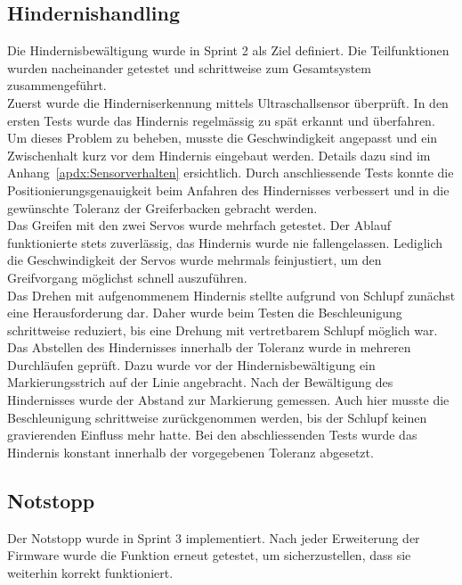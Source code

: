 \documentclass[main.tex]{subfiles} %
\begin{document}
\subsection*{Hindernishandling}
Die Hindernisbewältigung wurde in Sprint 2 als Ziel definiert. Die
Teilfunktionen wurden nacheinander getestet und schrittweise zum
Gesamtsystem zusammengeführt.\\
Zuerst wurde die Hinderniserkennung mittels Ultraschallsensor
überprüft. In den ersten Tests wurde das Hindernis regelmässig zu spät erkannt
und überfahren. Um dieses Problem zu beheben, musste die
Geschwindigkeit angepasst und ein Zwischenhalt kurz vor dem Hindernis
eingebaut werden.
Details dazu sind im Anhang~\ref{apdx:Sensorverhalten} ersichtlich.
Durch anschliessende Tests konnte die Positionierungsgenauigkeit beim Anfahren
des Hindernisses verbessert und in die gewünschte Toleranz der
Greiferbacken gebracht werden.\\
Das Greifen mit den zwei Servos wurde mehrfach getestet. Der Ablauf
funktionierte stets zuverlässig, das Hindernis wurde nie fallengelassen.
Lediglich die Geschwindigkeit der Servos wurde mehrmals feinjustiert,
um den Greifvorgang möglichst schnell auszuführen.\\
Das Drehen mit aufgenommenem Hindernis stellte aufgrund von Schlupf
zunächst eine Herausforderung dar. Daher wurde beim Testen die
Beschleunigung schrittweise
reduziert, bis eine Drehung mit vertretbarem Schlupf möglich war.\\
Das Abstellen des Hindernisses innerhalb der Toleranz wurde in
mehreren Durchläufen geprüft. Dazu wurde vor der Hindernisbewältigung
ein Markierungsstrich
auf der Linie angebracht. Nach der Bewältigung des Hindernisses wurde
der Abstand zur Markierung gemessen. Auch hier musste die
Beschleunigung schrittweise
zurückgenommen werden, bis der Schlupf keinen gravierenden Einfluss
mehr hatte. Bei den abschliessenden Tests wurde das Hindernis
konstant innerhalb der
vorgegebenen Toleranz abgesetzt.

\subsection*{Notstopp}
Der Notstopp wurde in Sprint 3 implementiert. Nach jeder Erweiterung
der Firmware wurde die Funktion erneut getestet, um sicherzustellen,
dass sie weiterhin korrekt funktioniert.
\end{document}
